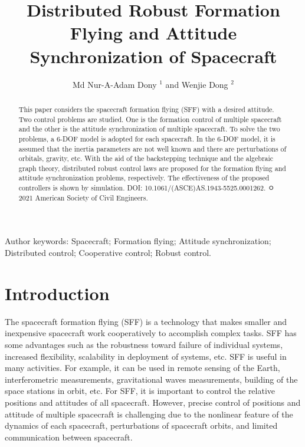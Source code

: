 \documentclass[10pt]{article}
\title{Distributed Robust Formation Flying and Attitude Synchronization of Spacecraft }
\author{Md Nur-A-Adam Dony ${ }^{1}$ and Wenjie Dong ${ }^{2}$}
\date{}
\begin{document}
\maketitle


\begin{abstract}
This paper considers the spacecraft formation flying (SFF) with a desired attitude. Two control problems are studied. One is the formation control of multiple spacecraft and the other is the attitude synchronization of multiple spacecraft. To solve the two problems, a 6-DOF model is adopted for each spacecraft. In the 6-DOF model, it is assumed that the inertia parameters are not well known and there are perturbations of orbitals, gravity, etc. With the aid of the backstepping technique and the algebraic graph theory, distributed robust control laws are proposed for the formation flying and attitude synchronization problems, respectively. The effectiveness of the proposed controllers is shown by simulation. DOI: 10.1061/(ASCE)AS.1943-5525.0001262. ㅇ 2021 American Society of Civil Engineers.
\end{abstract}

Author keywords: Spacecraft; Formation flying; Attitude synchronization; Distributed control; Cooperative control; Robust control.

\section{Introduction}
The spacecraft formation flying (SFF) is a technology that makes smaller and inexpensive spacecraft work cooperatively to accomplish complex tasks. SFF has some advantages such as the robustness toward failure of individual systems, increased flexibility, scalability in deployment of systems, etc. SFF is useful in many activities. For example, it can be used in remote sensing of the Earth, interferometric measurements, gravitational waves measurements, building of the space stations in orbit, etc. For SFF, it is important to control the relative positions and attitudes of all spacecraft. However, precise control of positions and attitude of multiple spacecraft is challenging due to the nonlinear feature of the dynamics of each spacecraft, perturbations of spacecraft orbits, and limited communication between spacecraft.
\end{document}
